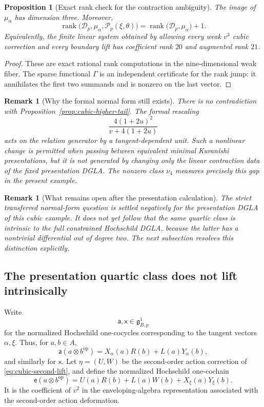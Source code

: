 \documentclass[11pt]{amsart}
\newtheorem{proposition}[theorem]{Proposition}
\newtheorem{remark}[theorem]{Remark}
\newcommand{\rank}{\operatorname{rank}}
\newcommand{\cD}{\mathscr D}
\newcommand{\cP}{\mathscr P}
\newcommand{\ghoch}{\mathfrak g}
\begin{document}
\begin{proposition}[Exact rank check for the contraction ambiguity]\label{prop:quartic-rank-check}
The image of $\mu_\alpha$ has dimension three.  Moreover,
\[
\rank\bigl(\cD_p,\mu_\alpha,\cP_p(\xi,\theta)\bigr)
=
\rank\bigl(\cD_p,\mu_\alpha\bigr)+1.
\]
Equivalently, the finite linear system obtained by allowing every weak $v^3$ cubic correction and every boundary lift has coefficient rank $20$ and augmented rank $21$.
\end{proposition}

\begin{proof}
These are exact rational rank computations in the nine-dimensional weak fiber.  The sparse functional $\Gamma$ is an independent certificate for the rank jump: it annihilates the first two summands and is nonzero on the last vector.
\end{proof}

\begin{remark}[Why the formal normal form still exists]
There is no contradiction with Proposition~\ref{prop:cubic-higher-tail}.  The formal rescaling
\[
\frac{4(1+2u)^2}{v+4(1+2u)}
\]
acts on the \emph{relation generator} by a tangent-dependent unit.  Such a nonlinear change is permitted when passing between equivalent minimal Kuranishi presentations, but it is not generated by changing only the linear contraction data of the fixed presentation DGLA.  The nonzero class $\nu_4$ measures precisely this gap in the present example.
\end{remark}

\begin{remark}[What remains open after the presentation calculation]
The strict transferred normal-form question is settled negatively for the \emph{presentation} DGLA of this cubic example.  It does not yet follow that the same quartic class is intrinsic to the full constrained Hochschild DGLA, because the latter has a nontrivial differential out of degree two.  The next subsection resolves this distinction explicitly.
\end{remark}

\subsection{The presentation quartic class does not lift intrinsically}\label{subsec:intrinsic-quartic}

Write
\[
\mathsf a,\mathsf x\in\ghoch^1_{B,p}
\]
for the normalized Hochschild one-cocycles corresponding to the tangent vectors
$\alpha,\xi$.  Thus, for $a,b\in A$,
\[
\mathsf a(a\otimes b^{\mathrm{op}})
=
X_\alpha(a)R(b)+L(a)Y_\alpha(b),
\]
and similarly for $\mathsf x$.
Let $\eta=(U,W)$ be the second-order action correction of
\eqref{eq:cubic-second-lift}, and define the normalized Hochschild one-cochain
\[
\mathsf e(a\otimes b^{\mathrm{op}})
=
U(a)R(b)+L(a)W(b)+X_\xi(a)Y_\xi(b).
\]
It is the coefficient of $v^2$ in the enveloping-algebra representation
associated with the second-order action deformation.
\end{document}
